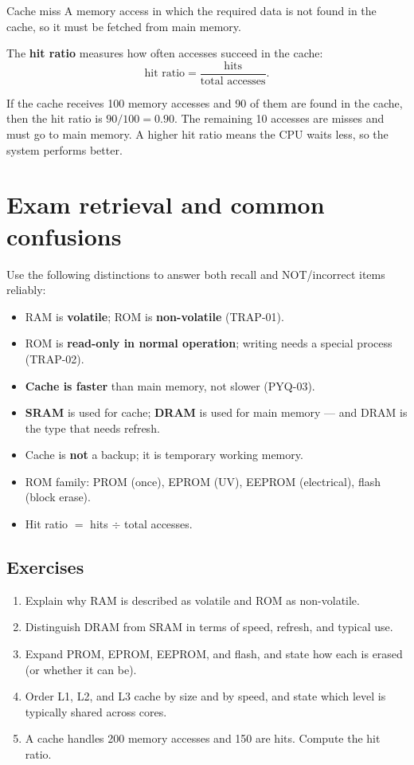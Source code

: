 \begin{definitionbox}{Cache miss}
A memory access in which the required data is not found in the cache, so it
must be fetched from main memory.
\end{definitionbox}

The \textbf{hit ratio} measures how often accesses succeed in the cache:
\[
\text{hit ratio} = \frac{\text{hits}}{\text{total accesses}}.
\]

\begin{example}
If the cache receives 100 memory accesses and 90 of them are found in the
cache, then the hit ratio is $90/100 = 0.90$. The remaining 10 accesses are
misses and must go to main memory. A higher hit ratio means the CPU waits
less, so the system performs better.
\end{example}

\section{Exam retrieval and common confusions}
Use the following distinctions to answer both recall and NOT/incorrect
items reliably:
\begin{itemize}
  \item RAM is \textbf{volatile}; ROM is \textbf{non-volatile} (TRAP-01).
  \item ROM is \textbf{read-only in normal operation}; writing needs a
    special process (TRAP-02).
  \item \textbf{Cache is faster} than main memory, not slower (PYQ-03).
  \item \textbf{SRAM} is used for cache; \textbf{DRAM} is used for main
    memory --- and DRAM is the type that needs refresh.
  \item Cache is \textbf{not} a backup; it is temporary working memory.
  \item ROM family: PROM (once), EPROM (UV), EEPROM (electrical), flash
    (block erase).
  \item Hit ratio $=$ hits $\div$ total accesses.
\end{itemize}

\subsection*{Exercises}
\begin{enumerate}[label=\arabic*.]
  \item Explain why RAM is described as volatile and ROM as non-volatile.
  \item Distinguish DRAM from SRAM in terms of speed, refresh, and typical
    use.
  \item Expand PROM, EPROM, EEPROM, and flash, and state how each is erased
    (or whether it can be).
  \item Order L1, L2, and L3 cache by size and by speed, and state which
    level is typically shared across cores.
  \item A cache handles 200 memory accesses and 150 are hits. Compute the
    hit ratio.
\end{enumerate}

